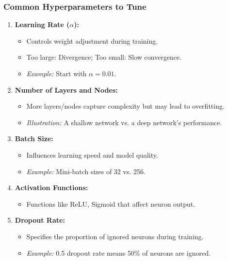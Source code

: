 \documentclass[aspectratio=169]{beamer}
\begin{document}
\begin{frame}
    \frametitle{Common Hyperparameters to Tune}
    \begin{enumerate}
        \item \textbf{Learning Rate ($\alpha$):}
            \begin{itemize}
                \item Controls weight adjustment during training.
                \item Too large: Divergence; Too small: Slow convergence.
                \item \textit{Example:} Start with $\alpha = 0.01$.
            \end{itemize}
        \item \textbf{Number of Layers and Nodes:}
            \begin{itemize}
                \item More layers/nodes capture complexity but may lead to overfitting.
                \item \textit{Illustration:} A shallow network vs. a deep network's performance.
            \end{itemize}
        \item \textbf{Batch Size:}
            \begin{itemize}
                \item Influences learning speed and model quality.
                \item \textit{Example:} Mini-batch sizes of 32 vs. 256.
            \end{itemize}
        \item \textbf{Activation Functions:}
            \begin{itemize}
                \item Functions like ReLU, Sigmoid that affect neuron output.
            \end{itemize}
        \item \textbf{Dropout Rate:}
            \begin{itemize}
                \item Specifies the proportion of ignored neurons during training.
                \item \textit{Example:} 0.5 dropout rate means 50\% of neurons are ignored.
            \end{itemize}
    \end{enumerate}
\end{frame}
\end{document}
